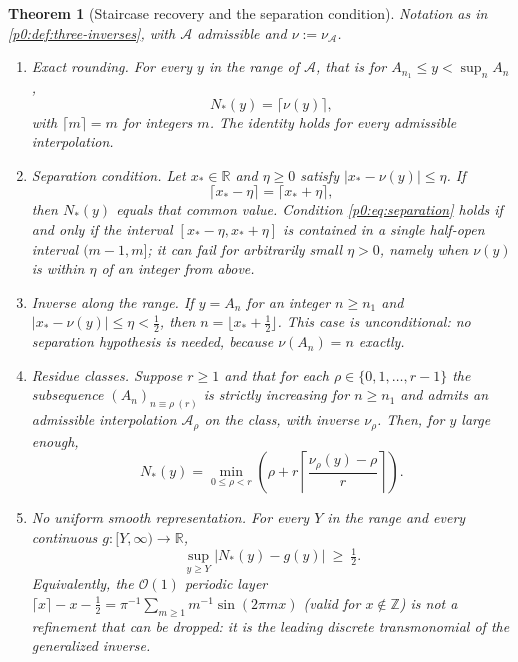 \documentclass[11pt,a4paper,oneside]{book}
\theoremstyle{plain}
\newtheorem{theorem}{Theorem}[chapter]
\theoremstyle{definition}
\theoremstyle{remark}
\newcommand{\Int}{\mathbb{Z}}
\newcommand{\Real}{\mathbb{R}}
\newcommand{\bigO}{\mathcal{O}}
\begin{document}
\begin{theorem}[Staircase recovery and the separation condition]
\label{p0:thm:staircase}
Notation as in \cref{p0:def:three-inverses}, with $\mathcal A$ admissible and
$\nu:=\nu_{\mathcal A}$.
\begin{enumerate}
\item \emph{Exact rounding.}  For every $y$ in the range of $\mathcal A$,
      that is for $A_{n_1}\le y<\sup_nA_n$,
      \begin{equation}\label{p0:eq:ceil-identity}
       N_\ast(y)=\bigl\lceil\nu(y)\bigr\rceil,
      \end{equation}
      with $\lceil m\rceil=m$ for integers $m$.  The identity holds for every
      admissible interpolation.
\item \emph{Separation condition.}  Let $x_\ast\in\Real$ and $\eta\ge0$ satisfy
      $|x_\ast-\nu(y)|\le\eta$.  If
      \begin{equation}\label{p0:eq:separation}
       \bigl\lceil x_\ast-\eta\bigr\rceil=\bigl\lceil x_\ast+\eta\bigr\rceil,
      \end{equation}
      then $N_\ast(y)$ equals that common value.  Condition
      \eqref{p0:eq:separation} holds if and only if the interval
      $[x_\ast-\eta,x_\ast+\eta]$ is contained in a single half-open interval
      $(m-1,m]$; it can fail for arbitrarily small $\eta>0$, namely when
      $\nu(y)$ is within $\eta$ of an integer from above.
\item \emph{Inverse along the range.}  If $y=A_n$ for an integer $n\ge n_1$ and
      $|x_\ast-\nu(y)|\le\eta<\tfrac12$, then $n=\lfloor x_\ast+\tfrac12\rfloor$.
      This case is unconditional: no separation hypothesis is needed, because
      $\nu(A_n)=n$ exactly.
\item \emph{Residue classes.}  Suppose $r\ge1$ and that for each
      $\rho\in\{0,1,\dots,r-1\}$ the subsequence $(A_n)_{n\equiv\rho\ (r)}$ is
      strictly increasing for $n\ge n_1$ and admits an admissible
      interpolation $\mathcal A_\rho$ on the class, with inverse $\nu_\rho$.
      Then, for $y$ large enough,
      \begin{equation}\label{p0:eq:residue-staircase}
       N_\ast(y)=\min_{0\le\rho<r}
        \left(\rho+r\left\lceil\frac{\nu_\rho(y)-\rho}{r}\right\rceil\right).
      \end{equation}
\item \emph{No uniform smooth representation.}  For every $Y$ in the range and
      every continuous $g:[Y,\infty)\to\Real$,
      \begin{equation}\label{p0:eq:no-smooth}
       \sup_{y\ge Y}\bigl|N_\ast(y)-g(y)\bigr|\ \ge\ \tfrac12 .
      \end{equation}
      Equivalently, the $\bigO(1)$ periodic layer
      $\lceil x\rceil-x-\tfrac12=\pi^{-1}\sum_{m\ge1}m^{-1}\sin(2\pi mx)$
      (valid for $x\notin\Int$) is not a refinement that can be dropped: it is
      the leading discrete transmonomial of the generalized inverse.
\end{enumerate}
\end{theorem}
\end{document}
